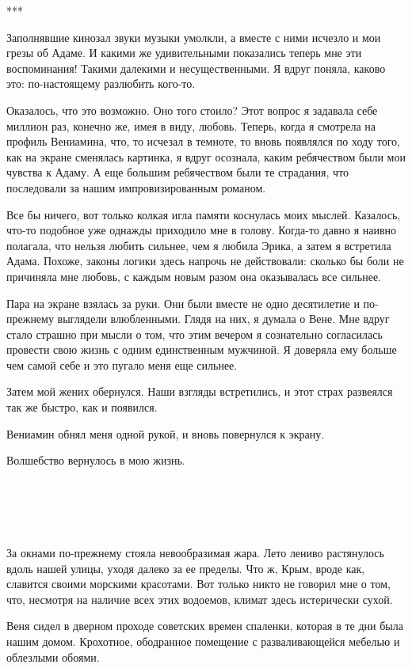 \documentclass[
]{book}
\begin{document}
***

Заполнявшие кинозал звуки музыки умолкли, а вместе с ними исчезло и мои грезы об Адаме. И какими же удивительными показались теперь мне эти воспоминания! Такими далекими и несущественными. Я вдруг поняла, каково это: по-настоящему разлюбить кого-то.

Оказалось, что это возможно. Оно того стоило? Этот вопрос я задавала себе миллион раз, конечно же, имея в виду, любовь. Теперь, когда я смотрела на профиль Вениамина, что, то исчезал в темноте, то вновь появлялся по ходу того, как на экране сменялась картинка, я вдруг осознала, каким ребячеством были мои чувства к Адаму. А еще большим ребячеством были те страдания, что последовали за нашим импровизированным романом.

Все бы ничего, вот только колкая игла памяти коснулась моих мыслей. Казалось, что-то подобное уже однажды приходило мне в голову. Когда-то давно я наивно полагала, что нельзя любить сильнее, чем я любила Эрика, а затем я встретила Адама. Похоже, законы логики здесь напрочь не действовали: сколько бы боли не причиняла мне любовь, с каждым новым разом она оказывалась все сильнее.

Пара на экране взялась за руки. Они были вместе не одно десятилетие и по-прежнему выглядели влюбленными. Глядя на них, я думала о Вене. Мне вдруг стало страшно при мысли о том, что этим вечером я сознательно согласилась провести свою жизнь с одним единственным мужчиной. Я доверяла ему больше чем самой себе и это пугало меня еще сильнее.

Затем мой жених обернулся. Наши взгляды встретились, и этот страх развеялся так же быстро, как и появился.

Вениамин обнял меня одной рукой, и вновь повернулся к экрану.

Волшебство вернулось в мою жизнь.

\hypertarget{chapter-50}{%
\chapter{~}\label{chapter-50}}

За окнами по-прежнему стояла невообразимая жара. Лето лениво растянулось вдоль нашей улицы, уходя далеко за ее пределы. Что ж, Крым, вроде как, славится своими морскими красотами. Вот только никто не говорил мне о том, что, несмотря на наличие всех этих водоемов, климат здесь истерически сухой.

Веня сидел в дверном проходе советских времен спаленки, которая в те дни была нашим домом. Крохотное, ободранное помещение с разваливающейся мебелью и облезлыми обоями.
\end{document}
